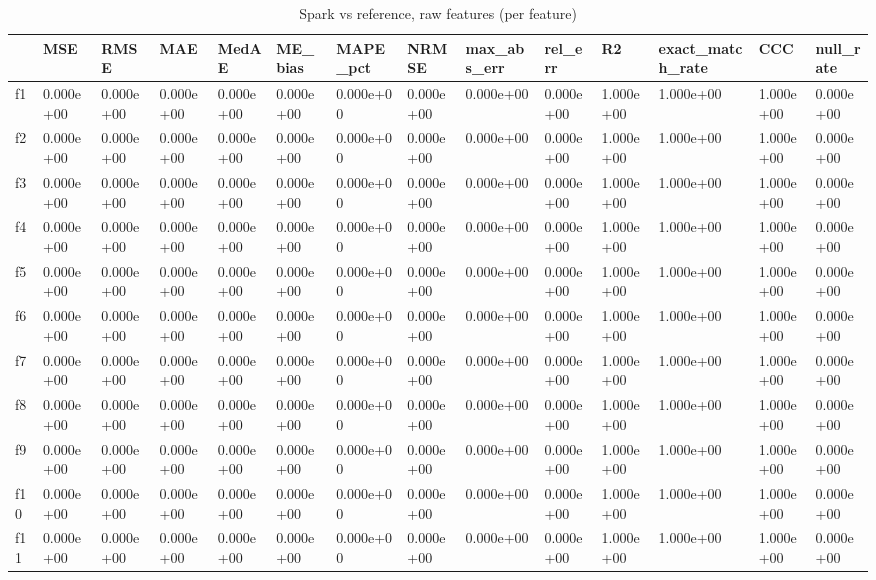 \begin{table}
\caption{Spark vs reference, raw features (per feature)}
\label{tab:01_feature_error_raw}
\begin{tabular}{llllllllllllll}
\toprule
 & MSE & RMSE & MAE & MedAE & ME\_bias & MAPE\_pct & NRMSE & max\_abs\_err & rel\_err & R2 & exact\_match\_rate & CCC & null\_rate \\
\midrule
f1 & 0.000e+00 & 0.000e+00 & 0.000e+00 & 0.000e+00 & 0.000e+00 & 0.000e+00 & 0.000e+00 & 0.000e+00 & 0.000e+00 & 1.000e+00 & 1.000e+00 & 1.000e+00 & 0.000e+00 \\
f2 & 0.000e+00 & 0.000e+00 & 0.000e+00 & 0.000e+00 & 0.000e+00 & 0.000e+00 & 0.000e+00 & 0.000e+00 & 0.000e+00 & 1.000e+00 & 1.000e+00 & 1.000e+00 & 0.000e+00 \\
f3 & 0.000e+00 & 0.000e+00 & 0.000e+00 & 0.000e+00 & 0.000e+00 & 0.000e+00 & 0.000e+00 & 0.000e+00 & 0.000e+00 & 1.000e+00 & 1.000e+00 & 1.000e+00 & 0.000e+00 \\
f4 & 0.000e+00 & 0.000e+00 & 0.000e+00 & 0.000e+00 & 0.000e+00 & 0.000e+00 & 0.000e+00 & 0.000e+00 & 0.000e+00 & 1.000e+00 & 1.000e+00 & 1.000e+00 & 0.000e+00 \\
f5 & 0.000e+00 & 0.000e+00 & 0.000e+00 & 0.000e+00 & 0.000e+00 & 0.000e+00 & 0.000e+00 & 0.000e+00 & 0.000e+00 & 1.000e+00 & 1.000e+00 & 1.000e+00 & 0.000e+00 \\
f6 & 0.000e+00 & 0.000e+00 & 0.000e+00 & 0.000e+00 & 0.000e+00 & 0.000e+00 & 0.000e+00 & 0.000e+00 & 0.000e+00 & 1.000e+00 & 1.000e+00 & 1.000e+00 & 0.000e+00 \\
f7 & 0.000e+00 & 0.000e+00 & 0.000e+00 & 0.000e+00 & 0.000e+00 & 0.000e+00 & 0.000e+00 & 0.000e+00 & 0.000e+00 & 1.000e+00 & 1.000e+00 & 1.000e+00 & 0.000e+00 \\
f8 & 0.000e+00 & 0.000e+00 & 0.000e+00 & 0.000e+00 & 0.000e+00 & 0.000e+00 & 0.000e+00 & 0.000e+00 & 0.000e+00 & 1.000e+00 & 1.000e+00 & 1.000e+00 & 0.000e+00 \\
f9 & 0.000e+00 & 0.000e+00 & 0.000e+00 & 0.000e+00 & 0.000e+00 & 0.000e+00 & 0.000e+00 & 0.000e+00 & 0.000e+00 & 1.000e+00 & 1.000e+00 & 1.000e+00 & 0.000e+00 \\
f10 & 0.000e+00 & 0.000e+00 & 0.000e+00 & 0.000e+00 & 0.000e+00 & 0.000e+00 & 0.000e+00 & 0.000e+00 & 0.000e+00 & 1.000e+00 & 1.000e+00 & 1.000e+00 & 0.000e+00 \\
f11 & 0.000e+00 & 0.000e+00 & 0.000e+00 & 0.000e+00 & 0.000e+00 & 0.000e+00 & 0.000e+00 & 0.000e+00 & 0.000e+00 & 1.000e+00 & 1.000e+00 & 1.000e+00 & 0.000e+00 \\

\end{tabular}
\end{table}
